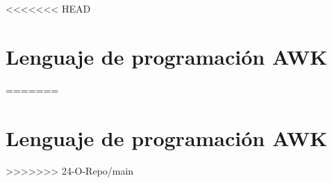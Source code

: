 <<<<<<< HEAD

\section*{Lenguaje de programación AWK}

=======

\section*{Lenguaje de programación AWK}

>>>>>>> 24-O-Repo/main
